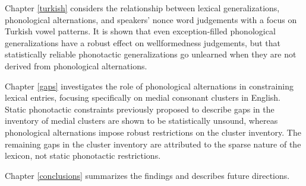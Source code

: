 Chapter \ref{turkish} considers the relationship between lexical generalizations, phonological alternations, and speakers' nonce word judgements with a focus on Turkish vowel patterns. It is shown that even exception-filled phonological generalizations have a robust effect on wellformedness judgements, but that statistically reliable phonotactic generalizations go unlearned when they are not derived from phonological alternations.

Chapter \ref{gaps} investigates the role of phonological alternations in constraining lexical entries, focusing specifically on medial consonant clusters in English. Static phonotactic constraints previously proposed to describe gaps in the inventory of medial clusters are shown to be statistically unsound, whereas phonological alternations impose robust restrictions on the cluster inventory. The remaining gaps in the cluster inventory are attributed to the sparse nature of the lexicon, not static phonotactic restrictions.

Chapter \ref{conclusions} summarizes the findings and describes future directions.

